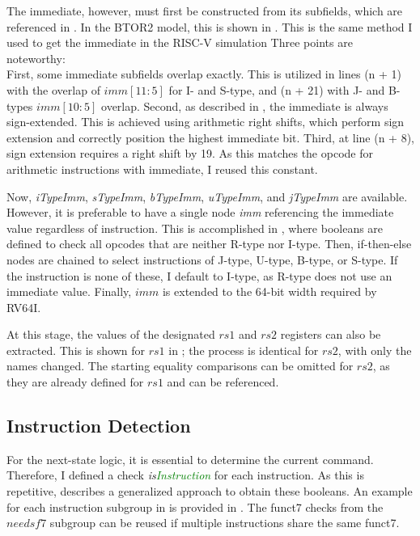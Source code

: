 The immediate, however, must first be constructed from its subfields,
which are referenced in . In the BTOR2
model, this is shown in . This is the
same method I used to get the immediate in the RISC-V simulation
 Three points are noteworthy:\\ First, some
immediate subfields overlap exactly. This is utilized in lines (n +
1) with the overlap of $imm[11:5]$ for I- and S-type, and (n + 21)
with J- and B-types $imm[10:5]$ overlap. Second, as described in
, the immediate is always sign-extended. This is
achieved using arithmetic right shifts, which perform sign extension
and correctly position the highest immediate bit. Third, at line (n +
8), sign extension requires a right shift by 19. As this matches the
opcode for arithmetic instructions with immediate, I reused this
constant.

Now, \textsl{iTypeImm}, \textsl{sTypeImm}, \textsl{bTypeImm},
\textsl{uTypeImm}, and \textsl{jTypeImm} are available. However, it
is preferable to have a single node \textsl{imm} referencing the
immediate value regardless of instruction. This is accomplished in
, where booleans are defined to check all
opcodes that are neither R-type nor I-type. Then, if-then-else nodes
are chained to select instructions of J-type, U-type, B-type, or
S-type. If the instruction is none of these, I default to I-type, as
R-type does not use an immediate value. Finally, $imm$ is extended to
the 64-bit width required by RV64I.

At this stage, the values of the designated $rs1$ and $rs2$ registers
can also be extracted. This is shown for $rs1$ in
; the process is identical for $rs2$, with
only the names changed. The starting equality comparisons can be
omitted for $rs2$, as they are already defined for $rs1$ and can be
referenced.






\subsection{Instruction Detection}
For the next-state logic, it is essential to determine the current
command. Therefore, I defined a check
\textsl{is\textcolor{Green}{Instruction}} for each instruction. As
this is repetitive,  describes a
generalized approach to obtain these booleans. An example for each
instruction subgroup in  is provided in
. The funct7 checks from the $needsf7$
subgroup can be reused if multiple instructions share the same
funct7.

